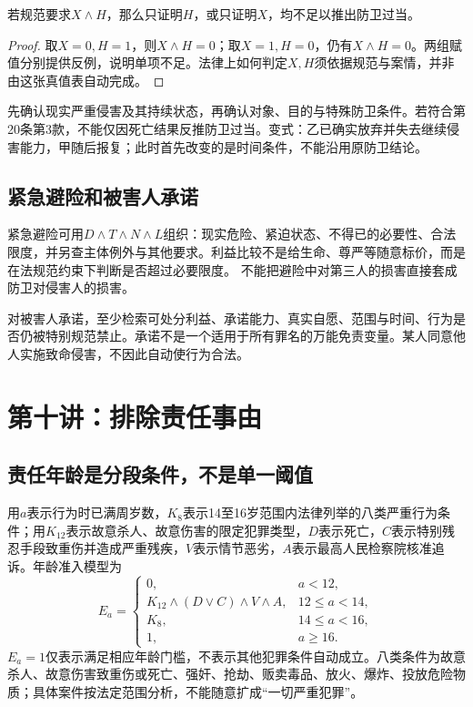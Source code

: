 \begin{modelprop}[防卫过当的双条件结构]
若规范要求$X\wedge H$，那么只证明$H$，或只证明$X$，均不足以推出防卫过当。
\end{modelprop}
\begin{proof}
取$X=0,H=1$，则$X\wedge H=0$；取$X=1,H=0$，仍有$X\wedge H=0$。两组赋值分别提供反例，说明单项不足。法律上如何判定$X,H$须依据规范与案情，并非由这张真值表自动完成。
\end{proof}

先确认现实严重侵害及其持续状态，再确认对象、目的与特殊防卫条件。若符合第20条第3款，不能仅因死亡结果反推防卫过当。变式：乙已确实放弃并失去继续侵害能力，甲随后报复；此时首先改变的是时间条件，不能沿用原防卫结论。

\subsection{紧急避险和被害人承诺}
紧急避险可用$D\wedge T\wedge N\wedge L$组织：现实危险、紧迫状态、不得已的必要性、合法限度，并另查主体例外与其他要求。利益比较不是给生命、尊严等随意标价，而是在法规范约束下判断是否超过必要限度。 不能把避险中对第三人的损害直接套成防卫对侵害人的损害。

对被害人承诺，至少检索可处分利益、承诺能力、真实自愿、范围与时间、行为是否仍被特别规范禁止。承诺不是一个适用于所有罪名的万能免责变量。某人同意他人实施致命侵害，不因此自动使行为合法。


\section{第十讲：排除责任事由}
\subsection{责任年龄是分段条件，不是单一阈值}

用$a$表示行为时已满周岁数，$K_8$表示14至16岁范围内法律列举的八类严重行为条件；用$K_{12}$表示故意杀人、故意伤害的限定犯罪类型，$D$表示死亡，$C$表示特别残忍手段致重伤并造成严重残疾，$V$表示情节恶劣，$A$表示最高人民检察院核准追诉。年龄准入模型为
\[
 E_a=
 \begin{cases}
 0,&a<12,\\
 K_{12}\wedge(D\vee C)\wedge V\wedge A,&12\le a<14,\\
 K_8,&14\le a<16,\\
 1,&a\ge16.
 \end{cases}
\]
$E_a=1$仅表示满足相应年龄门槛，不表示其他犯罪条件自动成立。八类条件为故意杀人、故意伤害致重伤或死亡、强奸、抢劫、贩卖毒品、放火、爆炸、投放危险物质；具体案件按法定范围分析，不能随意扩成“一切严重犯罪”。

